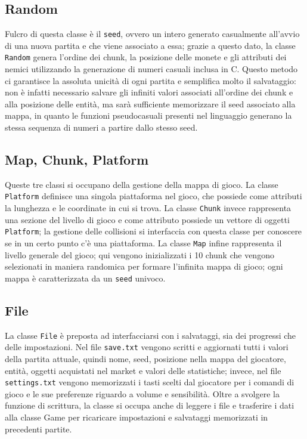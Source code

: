 \documentclass[a4paper]{article}
\def\CC{{C\nolinebreak[4]\hspace{-.05em}\raisebox{.4ex}{\tiny\bf ++}}}
\begin{document}
\subsection{Random}
Fulcro di questa classe è il \texttt{seed}, ovvero un intero generato 
casualmente all'avvio di una nuova partita e che viene associato a essa; grazie 
a questo dato, la classe \texttt{Random} genera l'ordine dei chunk, la posizione 
delle monete e gli attributi dei nemici utilizzando la generazione di numeri 
casuali inclusa in \CC. Questo metodo ci garantisce la assoluta unicità di ogni 
partita e semplifica molto il salvataggio: non è infatti necessario salvare gli
infiniti valori associati all'ordine dei chunk e alla posizione delle entità, ma 
sarà sufficiente memorizzare il seed associato alla mappa, in quanto le funzioni 
pseudocasuali presenti nel linguaggio generano la stessa sequenza di numeri a 
partire dallo stesso seed.

\subsection{Map, Chunk, Platform}
Queste tre classi si occupano della gestione della mappa di gioco. La classe 
\texttt{Platform} definisce una singola piattaforma nel gioco, che possiede come 
attributi la lunghezza e le coordinate in cui si trova. La classe \texttt{Chunk} 
invece rappresenta una sezione del livello di gioco e come attributo possiede 
un vettore di oggetti \texttt{Platform}; la gestione delle collisioni si 
interfaccia con questa classe per conoscere se in un certo punto c'è una 
piattaforma. La classe \texttt{Map} infine rappresenta il livello generale del 
gioco; qui vengono inizializzati i 10 chunk che vengono selezionati in maniera 
randomica per formare l'infinita mappa di gioco; ogni mappa è caratterizzata da 
un \texttt{seed} univoco.

\subsection{File}
La classe \texttt{File} è preposta ad interfacciarsi con i salvataggi, sia dei 
progressi che delle impostazioni. Nel file \texttt{save.txt} vengono scritti e 
aggiornati tutti i valori della partita attuale, quindi nome, seed, posizione 
nella mappa del giocatore, entità, oggetti acquistati nel market e valori delle 
statistiche; invece, nel file \texttt{settings.txt} vengono memorizzati i tasti
scelti dal giocatore per i comandi di gioco e le sue preferenze riguardo a 
volume e sensibilità. Oltre a svolgere la funzione di scrittura, la classe si 
occupa anche di leggere i file e trasferire i dati alla classe Game per 
ricaricare impostazioni e salvataggi memorizzati in precedenti partite.
\end{document}
